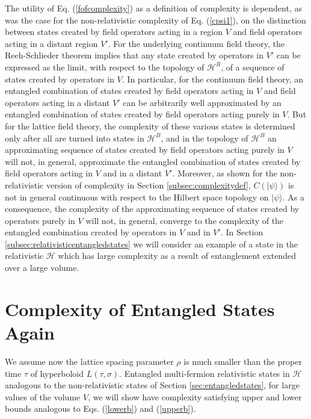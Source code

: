 \documentclass[twocolumn,amsmath,amssymb]{revtex4-1}
\begin{document}
The utility of Eq. (\ref{fofcomplexity}) as a definition of complexity is
dependent, as was the case for the
non-relativistic complexity of Eq. (\ref{cpsi1}), on the distinction
between states created by field operators acting in a region $V$ and field
operators acting in a distant region $V'$.
For the underlying continuum field theory,
the Reeh-Schlieder theorem implies that any state created by operators
in $V'$ can be expressed as the limit, with respect to the
topology of $\mathcal{H}^R$, of a sequence of states created
by operators in $V$.
In particular, for the continuum
field theory, an entangled combination of states created by field operators
acting in $V$ and field operators acting in a distant $V'$
can be arbitrarily well approximated by an entangled
combination of states created by field operators acting purely in $V$.
But for the lattice field theory, the complexity of these various states
is determined only after all are turned into states in $\mathcal{H}^B$,
and in the topology of $\mathcal{H}^B$ an approximating sequence
of states created by field operators acting purely in $V$
will not, in general,  approximate the entangled combination of
states created by field operators
acting in $V$ and in a distant $V'$.
Moreover, as shown for the
non-relativistic version of complexity in Section \ref{subsec:complexitydef},
$C( |\psi \rangle )$ is not in general continuous with respect to
the Hilbert space topology on $|\psi \rangle $.
As a consequence, the complexity of the approximating
sequence of states created by operators purely in $V$
will not, in general, converge to the complexity
of the entangled combination created by operators
in $V$ and in $V'$.
In Section \ref{subsec:relativisticentangledstates}
we will consider an example of a state in the relativistic $\mathcal{H}$
which has large complexity as a result of entanglement extended over a large volume.


\section{\label{subsec:relativisticentangledstates} Complexity of Entangled States Again }

We assume now the lattice spacing parameter $\rho$ is much smaller than the proper time
$\tau$ of hyperboloid $L(\tau, \sigma)$.
Entangled multi-fermion relativistic states in $\mathcal{H}$
analogous to the non-relativistic states of Section \ref{sec:entangledstates},
for large values of the volume $V$, we will show
have complexity satisfying upper and lower bounds analogous to Eqs. (\ref{lowerb}) and (\ref{upperb}).
\end{document}
